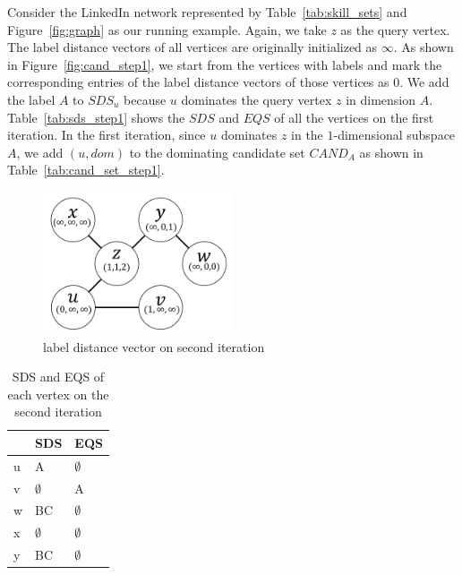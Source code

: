 Consider the LinkedIn network represented by Table~\ref{tab:skill_sets} and Figure~\ref{fig:graph} as our running example. Again, we take $z$ as the query vertex. The label distance vectors of all vertices are originally initialized as $\infty$. As shown in Figure~\ref{fig:cand_step1}, we start from the vertices with labels and mark the corresponding entries of the label distance vectors of those vertices as $0$. 
We add the label $A$ to $\mathit{SDS}_u$ because $u$ dominates the query vertex $z$ in dimension $A$. Table~\ref{tab:sds_step1} shows the $\mathit{SDS}$ and $\mathit{EQS}$ of all the vertices on the first iteration.
In the first iteration, since $u$ dominates $z$ in the $1$-dimensional subspace $A$, we add $(u, dom)$ to the dominating candidate set $\mathit{CAND}_A$ as shown in Table~\ref{tab:cand_set_step1}.

\begin{figure}[H]
    \centering
    \includegraphics[width=0.5\textwidth]{figs/graph_example_2}
    \caption{\label{font-figure}label distance vector on second iteration}
    \label{fig:cand_step2}
\end{figure}

\begin{table}[H]
    \centering
    \begin{tabular}{|l|l|l|}
    \hline
      & SDS         & EQS         \\ \hline
    u & A           & $\emptyset$ \\ \hline
    v & $\emptyset$ & A           \\ \hline
    w & BC          & $\emptyset$ \\ \hline
    x & $\emptyset$ & $\emptyset$ \\ \hline
    y & BC          & $\emptyset$ \\ \hline
    \end{tabular}
    \caption{\label{font-table}SDS and EQS of each vertex on the second iteration}
    \label{tab:sds_step2}
\end{table}


